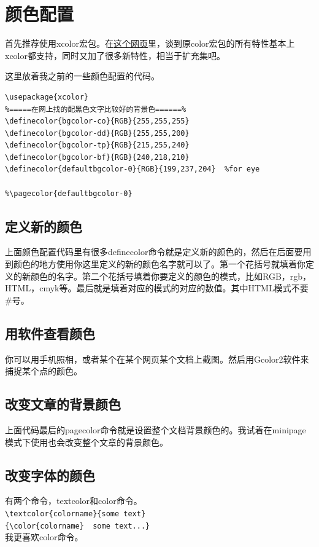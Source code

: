 \documentclass[11pt,oneside]{book}
\begin{document}
\section{颜色配置}
首先推荐使用xcolor宏包。在\href{http://tex.stackexchange.com/questions/89763/when-to-use-the-xcolor-package-instead-of-the-color-package}{这个网页}里，谈到原color宏包的所有特性基本上xcolor都支持，同时又加了很多新特性，相当于扩充集吧。

这里放着我之前的一些颜色配置的代码。
\begin{Verbatim}
\usepackage{xcolor}  
%=====在网上找的配黑色文字比较好的背景色======%
\definecolor{bgcolor-co}{RGB}{255,255,255}  
\definecolor{bgcolor-dd}{RGB}{255,255,200}  
\definecolor{bgcolor-tp}{RGB}{215,255,240}  
\definecolor{bgcolor-bf}{RGB}{240,218,210}  
\definecolor{defaultbgcolor-0}{RGB}{199,237,204}  %for eye

%\pagecolor{defaultbgcolor-0}
\end{Verbatim}


\subsection{定义新的颜色}
上面颜色配置代码里有很多definecolor命令就是定义新的颜色的，然后在后面要用到颜色的地方使用你这里定义的新的颜色名字就可以了。第一个花括号就填着你定义的新颜色的名字。第二个花括号填着你要定义的颜色的模式，比如RGB，rgb，HTML，cmyk等。最后就是填着对应的模式的对应的数值。其中HTML模式不要\#号。

\subsection{用软件查看颜色}
你可以用手机照相，或者某个在某个网页某个文档上截图。然后用Gcolor2软件来捕捉某个点的颜色。

\subsection{改变文章的背景颜色}
上面代码最后的pagecolor命令就是设置整个文档背景颜色的。我试着在minipage模式下使用也会改变整个文章的背景颜色。


\subsection{改变字体的颜色}
有两个命令，textcolor和color命令。\\
\verb+\textcolor{colorname}{some text}+\\
\verb+{\color{colorname}  some text...}+\\
我更喜欢color命令。
\end{document}
